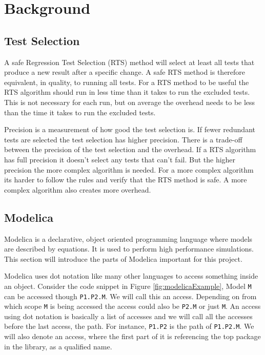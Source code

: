 \documentclass{cslthse-msc}
\begin{document}
\chapter[Background]{Background}

\section{Test Selection}
A safe Regression Test Selection (RTS) method will select at least all tests that produce a new result after a specific change. \cite{DBLP:conf/pppj/OqvistHM16} A safe RTS method is therefore equivalent, in quality, to running all tests. For a RTS method to be useful the RTS algorithm should run in less time than it takes to run the excluded tests. This is not necessary for each run, but on average the overhead needs to be less than the time it takes to run the excluded tests.

Precision is a measurement of how good the test selection is. \cite{DBLP:conf/sigsoft/LegunsenHSLZM16} If fewer redundant tests are selected the test selection has higher precision. There is a trade-off between the precision of the test selection and the overhead. If a RTS algorithm has full precision it doesn't select any tests that can't fail. But the higher precision the more complex algorithm is needed. For a more complex algorithm its harder to follow the rules and verify that the RTS method is safe. A more complex algorithm also creates more overhead.

\section{Modelica}
Modelica is a declarative, object oriented programming language where models are described by equations. It is used to perform high performance simulations. This section will introduce the parts of Modelica important for this project.

Modelica uses dot notation like many other languages to access something inside an object. Consider the code snippet in Figure \ref{fig:modelicaExample}, Model \texttt{M} can be accessed though \texttt{P1.P2.M}. We will call this an access. Depending on from which scope \texttt{M} is being accessed the access could also be \texttt{P2.M} or just \texttt{M}. An access using dot notation is basically a list of accesses and we will call all the accesses before the last access, the path. For instance, \texttt{P1.P2} is the path of \texttt{P1.P2.M}. We will also denote an access, where the first part of it is referencing the top package in the library, as a qualified name.
\end{document}
